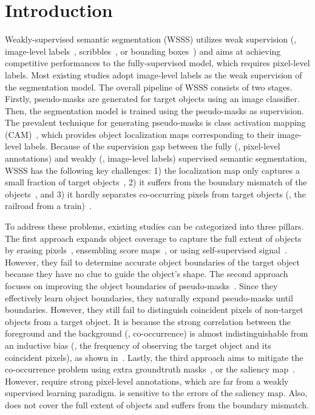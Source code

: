 \documentclass[final]{cvpr}
\begin{document}
\section{Introduction}

Weakly-supervised semantic segmentation (WSSS) utilizes weak supervision (\eg, image-level labels~\cite{pathak2015constrained, pinheiro2015image}, scribbles~\cite{lin2016scribblesup}, or bounding boxes~\cite{khoreva2017simple}) and aims at achieving competitive performances to the fully-supervised model, which requires pixel-level labels. Most existing studies adopt image-level labels as the weak supervision of the segmentation model. The overall pipeline of WSSS consists of two stages. Firstly, pseudo-masks are generated for target objects using an image classifier. Then, the segmentation model is trained using the pseudo-masks as supervision. The prevalent technique for generating pseudo-masks is class activation mapping (CAM)~\cite{zhou2016learning}, which provides object localization maps corresponding to their image-level labels. Because of the supervision gap between the fully (\ie, pixel-level annotations) and weakly (\ie, image-level labels) supervised semantic segmentation, WSSS has the following key challenges: 1) the localization map only captures a small fraction of target objects~\cite{zhou2016learning}, 2) it suffers from the boundary mismatch of the objects~\cite{kim2017two}, and 3) it hardly separates co-occurring pixels from target objects (\eg, the railroad from a train)~\cite{kolesnikov2016seed}. 



To address these problems, existing studies can be categorized into three pillars. The first approach expands object coverage to capture the full extent of objects by erasing pixels~\cite{choe2020attention,kim2017two, li2018tell}, ensembling score maps~\cite{jiang2019integral, lee2019ficklenet}, or using self-supervised signal~\cite{wang2020self}. However, they fail to determine accurate object boundaries of the target object because they have no clue to guide the object's shape. The second approach focuses on improving the object boundaries of pseudo-masks~\cite{fan2020learning,chen2020boundary}. Since they effectively learn object boundaries, they naturally expand pseudo-masks until boundaries. However, they still fail to distinguish coincident pixels of non-target objects from a target object. It is because the strong correlation between the foreground and the background (\ie, co-occurrence) is almost indistinguishable from an inductive bias (\ie, the frequency of observing the target object and its coincident pixels), as shown in~\cite{choe2020evaluating}. Lastly, the third approach aims to mitigate the co-occurrence problem using extra groundtruth masks~\cite{BMVC2016_92}, or the saliency map~\cite{oh2017exploiting, yao2020saliency}. However, \cite{BMVC2016_92,li2018tell} require strong pixel-level annotations, which are far from a weakly supervised learning paradigm. \cite{oh2017exploiting} is sensitive to the errors of the saliency map. Also, \cite{yao2020saliency} does not cover the full extent of objects and suffers from the boundary mismatch.
\end{document}
